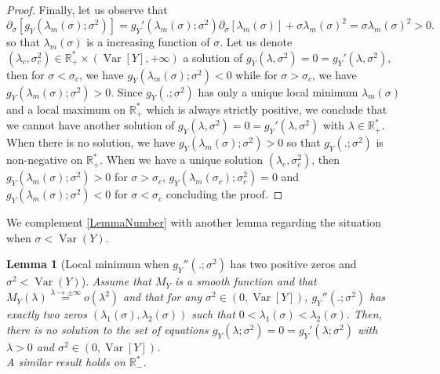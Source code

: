 \documentclass[a4paper, 10pt]{article}
\newcommand{\beq}{\begin{equation}}
\newcommand{\eeq}{\end{equation}}
\newtheorem{lemma}{Lemma}[section]
\theoremstyle{definition}
\begin{document}
\begin{proof}
Finally, let us observe that
\beq  \partial_\sigma[g_Y(\lambda_m(\sigma);\sigma^2)]=g_Y'(\lambda_m(\sigma);\sigma^2) \partial_\sigma[\lambda_m(\sigma)]+ \sigma\lambda_m(\sigma)^2=\sigma\lambda_m(\sigma)^2>0 .\eeq
so that $\lambda_m(\sigma)$ is a increasing function of $\sigma$. Let us denote $(\lambda_c,\sigma_c^2)\in \mathbb{R}_+^*\times \left(\operatorname{Var}[Y],+\infty\right)$ a solution of $g_Y(\lambda,\sigma^2)=0=g_Y'(\lambda,\sigma^2)$, then for $\sigma<\sigma_c$, we have $g_Y(\lambda_m(\sigma);\sigma^2)<0$ while for $\sigma>\sigma_c$, we have $g_Y(\lambda_m(\sigma);\sigma^2)>0$. Since $g_Y(.;\sigma^2)$ has only a unique local minimum $\lambda_m(\sigma)$ and a local maximum on $\mathbb{R}_+^*$ which is always strictly positive, we conclude that we cannot have another solution of $g_Y(\lambda,\sigma^2)=0=g_Y'(\lambda,\sigma^2)$ with $\lambda\in \mathbb{R}_+^*$. When there is no solution, we have $g_Y(\lambda_m(\sigma);\sigma^2)>0$ so that $g_Y(.;\sigma^2)$ is non-negative on $\mathbb{R}_+^*$. When we have a unique solution $(\lambda_c,\sigma_c^2)$, then $g_Y(\lambda_m(\sigma);\sigma^2)>0$ for $\sigma>\sigma_c$, $g_Y(\lambda_m(\sigma_c);\sigma_c^2)=0$ and $g_Y(\lambda_m(\sigma);\sigma^2)<0$ for $\sigma<\sigma_c$ concluding the proof. 
\end{proof}

We complement \autoref{LemmaNumber} with another lemma regarding the situation when $\sigma<\operatorname{Var}(Y)$.

\begin{lemma}[Local minimum when $g_Y''(.;\sigma^2)$ has two positive zeros and $\sigma^2<\operatorname{Var}(Y)$]\label{LemmaNumber2}
Assume that $M_Y$ is a smooth function and that $M_Y(\lambda)\overset{\lambda\to \pm\infty}{=}o(\lambda^2)$ and that for any $\sigma^2\in \left(0,\operatorname{Var}[Y]\right)$, $g_Y''(.;\sigma^2)$ has exactly two zeros $(\lambda_1(\sigma),\lambda_2(\sigma))$ such that $0<\lambda_1(\sigma)<\lambda_2(\sigma)$. Then, there is no solution to the set of equations $g_Y(\lambda;\sigma^2)=0=g_Y'(\lambda;\sigma^2)$ with $\lambda>0$ and $\sigma^2\in \left(0,\operatorname{Var}[Y]\right)$.\\
A similar result holds on $\mathbb{R}_-^*$.
\end{lemma}
\end{document}
